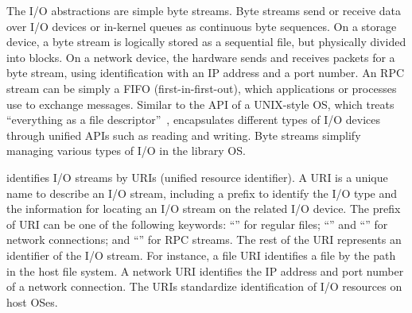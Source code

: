 The I/O abstractions are simple byte streams.
Byte streams send or receive data over I/O devices or in-kernel queues
as continuous byte sequences.
On a storage device,
a byte stream is logically stored as a sequential file,
but physically divided into blocks.
On a network device, the hardware sends and receives packets for a byte stream, using identification with an IP address and a port number.
An RPC stream can be simply a FIFO (first-in-first-out),
which applications or processes use to exchange messages.
Similar to the API of a UNIX-style OS,
which treats ``everything as a file descriptor''~\cite{ritchie78unix-retro},
\thehostabi{} encapsulates different types of I/O devices through unified APIs such as reading and writing.
Byte streams simplify managing various types of I/O in the library OS.


\Thehostabi{} identifies I/O streams by URIs (unified resource identifier).
A URI is a unique name to describe an I/O stream,
including a prefix to identify the I/O type and the information for locating an I/O stream on the related I/O device.
The prefix of URI can be one of the following
keywords: ``'' for regular files; ``'' and ``'' for network connections; and ``'' for RPC streams.
The rest of the URI represents an identifier of the I/O stream.
For instance, a file URI identifies a file by the path in the host file system.
A network URI identifies the IP address and port number of a network connection.
The URIs standardize identification of I/O resources on host OSes.




